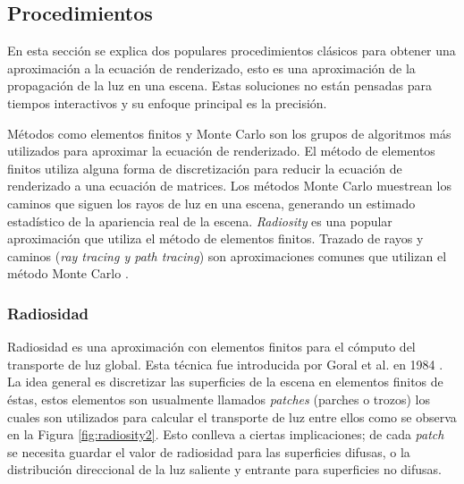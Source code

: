 \subsection{Procedimientos}
\label{sub:render_eq_procedures}
En esta sección se explica dos populares procedimientos clásicos para obtener una aproximación a la ecuación de renderizado, esto es una aproximación de la propagación de la luz en una escena. Estas soluciones no están pensadas para tiempos interactivos y su enfoque principal es la precisión.

Métodos como elementos finitos y Monte Carlo son los grupos de algoritmos más utilizados para aproximar la ecuación de renderizado. El método de elementos finitos utiliza alguna forma de discretización para reducir la ecuación de renderizado a una ecuación de matrices. Los métodos Monte Carlo muestrean los caminos que siguen los rayos de luz en una escena, generando un estimado estadístico de la apariencia real de la escena. \emph{Radiosity} es una popular aproximación que utiliza el método de elementos finitos. Trazado de rayos y caminos (\emph{ray tracing y path tracing}) son aproximaciones comunes que utilizan el método Monte Carlo \cite{gi_renderingeq}. 

\subsubsection{Radiosidad}
\label{subsec:radiosity}

Radiosidad es una aproximación con elementos finitos para el cómputo del transporte de luz global. Esta técnica fue introducida por Goral et al. en 1984 \cite{goral84}. La idea general es discretizar las superficies de la escena en elementos finitos de éstas, estos elementos son usualmente llamados \emph{patches} (parches o trozos) los cuales son utilizados para calcular el transporte de luz entre ellos como se observa en la Figura \ref{fig:radiosity2}. Esto conlleva a ciertas implicaciones; de cada \emph{patch} se necesita guardar el valor de radiosidad para las superficies difusas, o la distribución direccional de la luz saliente y entrante para superficies no difusas.


